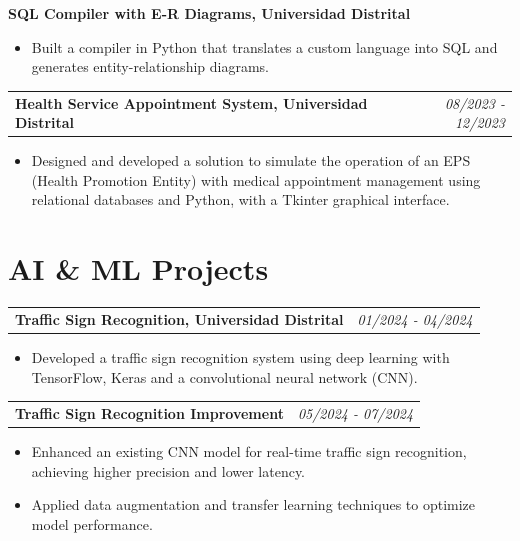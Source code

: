 \documentclass[letterpaper,12pt]{article}
\begin{document}
\noindent\textbf{SQL Compiler with E-R Diagrams, Universidad Distrital}
\begin{itemize}
    \item Built a compiler in Python that translates a custom language into SQL and generates entity-relationship diagrams.
\end{itemize}

\noindent\begin{tabularx}{\textwidth}{Xr}
    \textbf{Health Service Appointment System, Universidad Distrital} & \textit{08/2023 - 12/2023} \\
\end{tabularx}
\begin{itemize}
    \item Designed and developed a solution to simulate the operation of an EPS (Health Promotion Entity) with medical appointment management using relational databases and Python, with a Tkinter graphical interface.
\end{itemize}

\section*{\textcolor{primary}{AI \& ML Projects}}
\noindent\begin{tabularx}{\textwidth}{Xr}
    \textbf{Traffic Sign Recognition, Universidad Distrital} & \textit{01/2024 - 04/2024} \\
\end{tabularx}
\begin{itemize}
    \item Developed a traffic sign recognition system using deep learning with TensorFlow, Keras and a convolutional neural network (CNN).
\end{itemize}

\noindent\begin{tabularx}{\textwidth}{Xr}
    \textbf{Traffic Sign Recognition Improvement} & \textit{05/2024 - 07/2024} \\
\end{tabularx}
\begin{itemize}
    \item Enhanced an existing CNN model for real-time traffic sign recognition, achieving higher precision and lower latency.
    \item Applied data augmentation and transfer learning techniques to optimize model performance.
\end{itemize}
\end{document}

